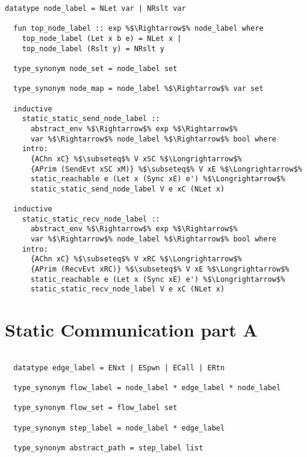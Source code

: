 \documentclass{article}
\begin{document}
\begin{lstlisting}[style=codestyle1, escapechar=\%]
  datatype node_label = NLet var | NRslt var

  fun top_node_label :: exp %$\Rightarrow$% node_label where
    top_node_label (Let x b e) = NLet x |
    top_node_label (Rslt y) = NRslt y

  type_synonym node_set = node_label set

  type_synonym node_map = node_label %$\Rightarrow$% var set

  inductive
    static_static_send_node_label ::
      abstract_env %$\Rightarrow$% exp %$\Rightarrow$%
      var %$\Rightarrow$% node_label %$\Rightarrow$% bool where
    intro:
      {AChn xC} %$\subseteq$% V xSC %$\Longrightarrow$%
      {APrim (SendEvt xSC xM)} %$\subseteq$% V xE %$\Longrightarrow$%
      static_reachable e (Let x (Sync xE) e') %$\Longrightarrow$%
      static_static_send_node_label V e xC (NLet x)

  inductive
    static_static_recv_node_label ::
      abstract_env %$\Rightarrow$% exp %$\Rightarrow$%
      var %$\Rightarrow$% node_label %$\Rightarrow$% bool where
    intro:
      {AChn xC} %$\subseteq$% V xRC %$\Longrightarrow$%
      {APrim (RecvEvt xRC)} %$\subseteq$% V xE %$\Longrightarrow$%
      static_reachable e (Let x (Sync xE) e') %$\Longrightarrow$%
      static_static_recv_node_label V e xC (NLet x)

  \end{lstlisting}

\section{Static Communication part A}
\begin{lstlisting}[style=codestyle1, escapechar=\%]

  datatype edge_label = ENxt | ESpwn | ECall | ERtn

  type_synonym flow_label = node_label * edge_label * node_label

  type_synonym flow_set = flow_label set

  type_synonym step_label = node_label * edge_label

  type_synonym abstract_path = step_label list
  \end{lstlisting}
\end{document}
